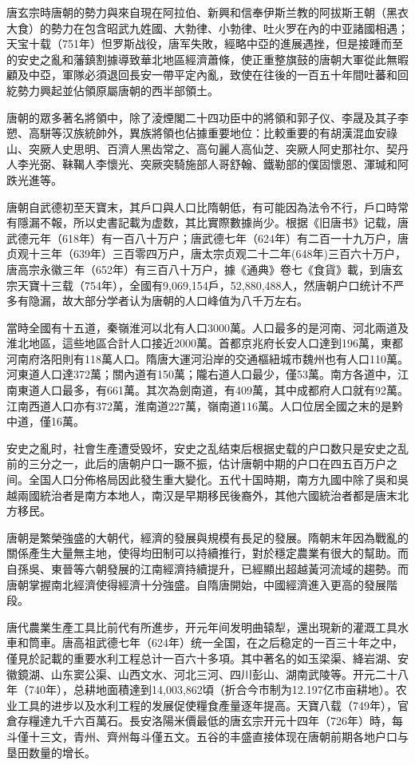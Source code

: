 唐玄宗時唐朝的勢力與來自現在阿拉伯、新興和信奉伊斯兰教的阿拔斯王朝（黑衣大食）的勢力在包含昭武九姓國、大勃律、小勃律、吐火罗在內的中亚諸國相遇；天宝十载（751年）怛罗斯战役，唐军失敗，經略中亞的進展遇挫，但是接踵而至的安史之亂和藩鎮割據導致華北地區經濟蕭條，使正重整旗鼓的唐朝大軍從此無暇顧及中亞，軍隊必須退回長安一帶平定內亂，致使在往後的一百五十年間吐蕃和回紇勢力興起並佔領原屬唐朝的西半部領土。

唐朝的眾多著名將領中，除了淩煙閣二十四功臣中的將領和郭子仪、李晟及其子李愬、高駢等汉族統帥外，異族將領也佔據重要地位：比較重要的有胡漢混血安祿山、突厥人史思明、百濟人黑齿常之、高句麗人高仙芝、突厥人阿史那社尔、契丹人李光弼、靺鞨人李懷光、突厥突騎施部人哥舒翰、鐵勒部的僕固懷恩、渾瑊和阿跌光進等。

唐朝自武德初至天寶末，其戶口與人口比隋朝低，有可能因為法令不行，戶口時常有隱漏不報，所以史書記載为虚数，其比實際數據尚少。根据《旧唐书》记载，唐武德元年（618年）有一百八十万户；唐武德七年（624年）有二百一十九万户，唐贞观十三年（639年）三百零四万户，唐太宗贞观二十二年(648年)三百六十万户，唐高宗永徽三年（652年）有三百八十万户，據《通典》卷七《食貨》載，到唐玄宗天寶十三载（754年），全國有9,069,154戶，52,880,488人，然唐朝户口统计不严多有隐漏，故大部分学者认为唐朝的人口峰值为八千万左右。

當時全國有十五道，秦嶺淮河以北有人口3000萬。人口最多的是河南、河北兩道及淮北地區，這些地區合計人口接近2000萬。首都京兆府长安人口達到196萬，東都河南府洛阳則有118萬人口。隋唐大運河沿岸的交通樞紐城市魏州也有人口110萬。河東道人口達372萬；關內道有150萬；隴右道人口最少，僅53萬。南方各道中，江南東道人口最多，有661萬。其次為劍南道，有409萬，其中成都府人口就有92萬。江南西道人口亦有372萬，淮南道227萬，嶺南道116萬。人口位居全國之末的是黔中道，僅16萬。

安史之亂时，社會生產遭受毁坏，安史之乱结束后根据史载的户口数只是安史之乱前的三分之一，此后的唐朝户口一蹶不振，估计唐朝中期的户口在四五百万户之间。全国人口分佈格局因此發生重大變化。五代十国時期，南方九國中除了吳和吳越兩國統治者是南方本地人，南汉是早期移民後裔外，其他六國統治者都是唐末北方移民。

唐朝是繁榮強盛的大朝代，經濟的發展與規模有長足的發展。隋朝末年因為戰亂的關係產生大量無主地，使得均田制可以持續推行，對於穩定農業有很大的幫助。而自孫吳、東晉等六朝發展的江南經濟持續提升，已經顯出超越黃河流域的趨勢。而唐朝掌握南北經濟使得經濟十分強盛。自隋唐開始，中國經濟進入更高的發展階段。

唐代農業生產工具比前代有所進步，开元年间发明曲辕犁，還出現新的灌溉工具水車和筒車。唐高祖武德七年（624年）统一全国，在之后稳定的一百三十年之中，僅見於記載的重要水利工程总计一百六十多項。其中著名的如玉梁渠、絳岩湖、安徽鏡湖、山东窦公渠、山西文水、河北三河、四川彭山、湖南武陵等。开元二十八年（740年），总耕地面積達到14,003,862頃（折合今市制为12.197亿市亩耕地）。农业工具的进步以及水利工程的发展促使糧食產量逐年提高。天寶八载（749年），官倉存糧達九千六百萬石。長安洛陽米價最低的唐玄宗开元十四年（726年）時，每斗僅十三文，青州、齊州每斗僅五文。五谷的丰盛直接体现在唐朝前期各地户口与垦田数量的增长。

